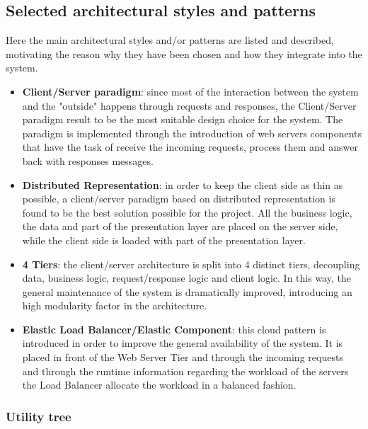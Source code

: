\subsection{Selected architectural styles and patterns}

\label{sec:selected-styles-patterns}

Here the main architectural styles and/or patterns are listed and described, motivating the reason why they have been chosen and how they integrate into the system.

\begin{itemize}	
	\item \textbf{Client/Server paradigm}: since most of the interaction between the system and the "outside" happens through requests and responses, the Client/Server paradigm result to be the most suitable design choice for the system.
The paradigm is implemented through the introduction of web servers components that have the task of receive the incoming requests, process them and answer back with responses messages.
	\item \textbf{Distributed Representation}: in order to keep the client side as thin as possible, a client/server paradigm based on distributed representation is found to be the best solution possible for the project. All the business logic, the data and part of the presentation layer are placed on the server side, while the client side is loaded with part of the presentation layer.
	\item \textbf{4 Tiers}: the client/server architecture is split into 4 distinct tiers, decoupling data, business logic, request/response logic and client logic. In this way, the general maintenance of the system is dramatically improved, introducing an high modularity factor in the architecture.
	\item \textbf{Elastic Load Balancer/Elastic Component}: this cloud pattern is introduced in order to improve the general availability of the system. It is placed in front of the Web Server Tier and through the incoming requests and through the runtime information regarding the workload of the servers the Load Balancer allocate the workload in a balanced fashion.
\end{itemize}

	\subsubsection{Utility tree}

